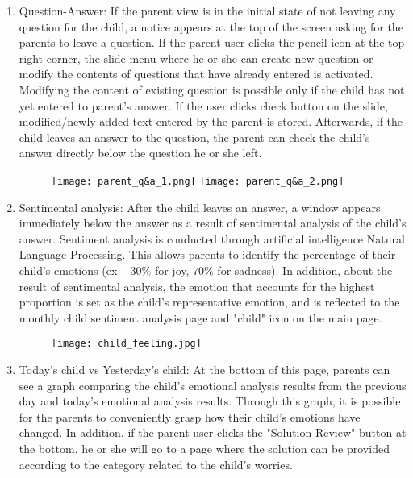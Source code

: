 \documentclass[conference]{IEEEtran}
\begin{document}
\begin{enumerate}
            \begin{enumerate}
                \item Question-Answer: If the parent view is in the initial state of not leaving any question for the child, a notice appears at the top of the screen asking for the parents to leave a question. If the parent-user clicks the pencil icon at the top right corner, the slide menu where he or she can create new question or modify the contents of questions that have already entered is activated. Modifying the content of existing question is possible only if the child has not yet entered to parent's answer. If the user clicks check button on the slide, modified/newly added text entered by the parent is stored. Afterwards, if the child leaves an answer to the question, the parent can check the child's answer directly below the question he or she left.
                 \begin{figure}[H]
                 \centering
                 \texttt{[image: parent\_q\&a\_1.png]}
                 \texttt{[image: parent\_q\&a\_2.png]}
                 \end{figure}
                \item Sentimental analysis:
                After the child leaves an answer, a window appears immediately below the answer as a result of sentimental analysis of the child's answer. Sentiment analysis is conducted through artificial intelligence Natural Language Processing. This allows parents to identify the percentage of their child's emotions (ex – 30\% for joy, 70\% for sadness). In addition, about the result of sentimental analysis, the emotion that accounts for the highest proportion is set as the child's representative emotion, and is reflected to the monthly child sentiment analysis page and "child" icon on the main page.
                \begin{figure}[H]
                 \centering
                 \texttt{[image: child\_feeling.jpg]}
                 \end{figure}
                \item Today's child vs Yesterday's child: At the bottom of this page, parents can see a graph comparing the child's emotional analysis results from the previous day and today's emotional analysis results. Through this graph, it is possible for the parents to conveniently grasp how their child's emotions have changed. In addition, if the parent user clicks the "Solution Review" button at the bottom, he or she will go to a page where the solution can be provided according to the category related to the child's worries.

\end{enumerate}
\end{enumerate}
\end{document}
